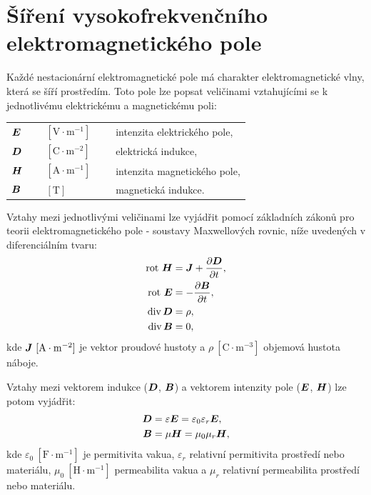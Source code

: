 \documentclass[12pt,a4paper,oneside]{article}
\numberwithin{equation}{section} %
\numberwithin{figure}{section} %
\numberwithin{table}{section} %
\renewcommand{\vec}[1]{\mbox{\boldmath$#1$}} %
\newcommand{\rot}{\mathrm{rot}\ }
\begin{document}
\newpage

\section{Šíření vysokofrekvenčního elektromagnetického pole}
Každé nestacionární elektromagnetické pole má charakter elektromagnetické vlny, která se šíří prostředím. Toto pole lze popsat veličinami vztahujícími se k jednotlivému elektrickému a magnetickému poli:
\begin{table}[h] %
\begin{center} %
\begin{tabular}{l l l}
$\vec{E}$~~~ & $\mathrm{[V \cdot m^{-1}]}$~~~ & intenzita elektrického pole, \\ 
$\vec{D}$ & $\mathrm{[C \cdot m^{-2}]}$ & elektrická indukce, \\ 
$\vec{H}$ & $\mathrm{[A \cdot m^{-1}]}$ & intenzita magnetického pole, \\ 
$\vec{B}$ & $\mathrm{[T]}$ & magnetická indukce. \\ 
\end{tabular} 
\end{center}
\end{table}

Vztahy mezi jednotlivými veličinami lze vyjádřit pomocí základních zákonů pro teorii elektromagnetického pole - soustavy Maxwellových rovnic, níže uvedených v diferenciálním tvaru:
\begin{subequations}
\begin{align}
\label{maxdif1}
\rot \vec{H} &= \vec{J} + \frac{\partial \vec{D}}{\partial t},
\\
\label{maxdif2}
\rot \vec{E} &= - \frac{\partial \vec{B}}{\partial t},
\\
\label{maxdif3}
\udiv \vec{D} &= \rho,
\\
\label{maxdif4}
\udiv \vec{B} &= 0,
\end{align}
\end{subequations}
kde $\vec{J} ~\mathrm{[A \cdot m^{-2}]}$ je vektor proudové hustoty a $\rho ~\mathrm{[C \cdot m^{-3}]}$ objemová hustota náboje. 

Vztahy mezi vektorem indukce ($\vec{D}$, $\vec{B}$) a vektorem intenzity pole ($\vec{E}$, $\vec{H}$) lze potom vyjádřit:
\begin{subequations}
\begin{align}
\label{epsilonE}
\vec{D} &= \varepsilon \vec{E} = \varepsilon _0 \varepsilon _r \vec{E},
\\
\label{muH}
\vec{B} &= \mu \vec{H} = \mu _0 \mu _r \vec{H},
\end{align}
\end{subequations}
kde $\varepsilon _0 ~\mathrm{[F \cdot m^{-1}]}$ je permitivita vakua, $\varepsilon _r$ relativní permitivita prostředí nebo materiálu, $\mu _0 ~\mathrm{[H \cdot m^{-1}]}$ permeabilita vakua a $\mu _r$ relativní permeabilita prostředí nebo materiálu.
\end{document}
